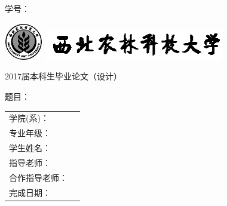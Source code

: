 \thispagestyle{empty}
\hfill 学号：\underline{\sid}

\vspace{20mm}

\begin{center}
	\includegraphics[width=1.7cm,height=1.62cm]{figures/logo.png}
	\includegraphics[width=7.82cm,height=1.29cm]{figures/logo2.png}
	\vspace{10mm}
	
	{\songti \LARGE \hspace{2mm} 2017届本科生毕业论文（设计）}
	
	\vspace{30mm}
	
	{\heiti \huge 题目：\uline \thtopic} 
	
	\vspace{30mm}
	
	\begin{table}[h]
		\songti \Large \centering
		\begin{tabular}{lc}
			学院(系)：&  \academy\\ 
			\cline{2-2}
			专业年级：&  \grade\\
			\cline{2-2}
			学生姓名：& \thauthor\\
			\cline{2-2}
			指导老师： & \thtutor\\
			\cline{2-2}
			合作指导老师：& \cootutor\\
			\cline{2-2}
			完成日期：&  \fishdate\\
			\cline{2-2}
		\end{tabular}
	\end{table}
\end{center}